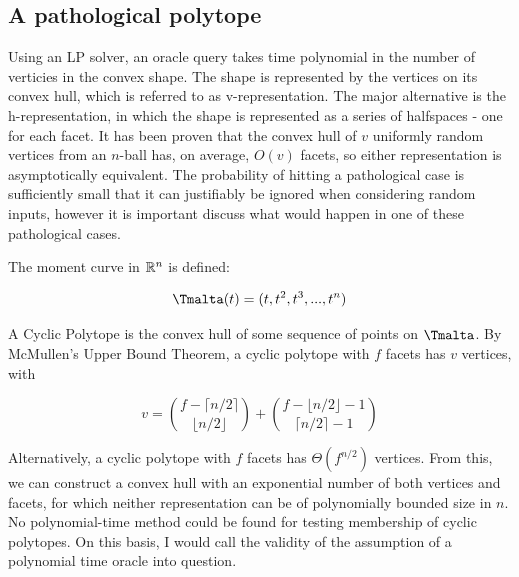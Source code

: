 \subsection{A pathological polytope}

Using an LP solver, an oracle query takes time polynomial in the number of verticies in the convex shape. The shape is represented by the vertices on its convex hull, which is referred to as v-representation. The major alternative is the h-representation, in which the shape is represented as a series of halfspaces - one for each facet. It has been proven %
that the convex hull of $v$ uniformly random vertices from an $n$-ball has, on average, $O(v)$ facets, so either representation is asymptotically equivalent. The probability of hitting a pathological case is sufficiently small that it can justifiably be ignored when considering random inputs, however it is important discuss what would happen in one of these pathological cases.

The moment curve in $\mathbb{R}^n$ is defined:

$$
\tengm(t) = (t, t^2, t^3, ..., t^n)
$$

A Cyclic Polytope is the convex hull of some sequence of points on $\tengm$. By McMullen's Upper Bound Theorem, a cyclic polytope with $f$ facets has $v$ vertices, with

$$
v = {{f-\lceil n/2 \rceil}\choose{\lfloor {n/2} \rfloor}} + {{f-\lfloor n/2 \rfloor -1} \choose {\lceil {n/2} \rceil - 1}}
$$

Alternatively, a cyclic polytope with $f$ facets has $\Theta(f^{n/2})$ vertices. From this, we can construct a convex hull with an exponential number of both vertices and facets, for which neither representation can be of polynomially bounded size in $n$. No polynomial-time method could be found for testing membership of cyclic polytopes. On this basis, I would call the validity of the assumption of a polynomial time oracle into question. 